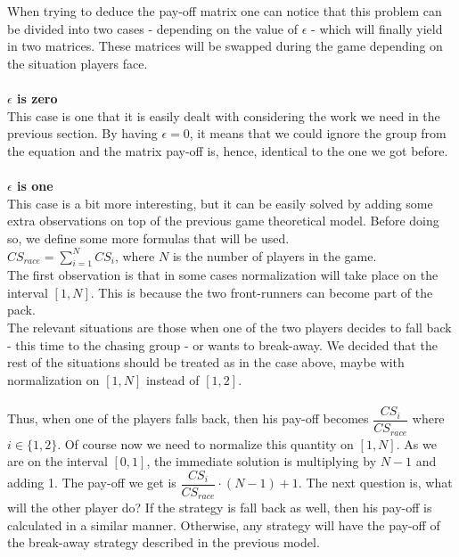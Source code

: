\documentclass[10pt, a4paper]{report}
\begin{document}
\\\\
When trying to deduce the pay-off matrix one can notice that this problem can be divided into two cases - depending on the value of $\epsilon$ - which will finally yield in two matrices. These matrices will be swapped during the game depending on the situation players face.
\\\\
\textbf{$\epsilon$ is zero}
\\
This case is one that it is easily dealt with considering the work we need in the previous section. By having $\epsilon = 0$, it means that we could ignore the group from the equation and the matrix pay-off is, hence, identical to the one we got before.
\\\\
\textbf{$\epsilon$ is one}
\\
This case is a bit more interesting, but it can be easily solved by adding some extra observations on top of the previous game theoretical model. Before doing so, we define some more formulas that will be used.\\
$CS_{race} = \sum\limits_{i=1}^{N} CS_i$, where $N$ is the number of players in the game. \\
The first observation is that in some cases normalization will take place on the interval $[1,N]$. This is because the two front-runners can become part of the pack.\\
The relevant situations are those when one of the two players decides to fall back - this time to the chasing group - or wants to break-away. We decided that the rest of the situations should be treated as in the case above, maybe with normalization on $[1,N]$ instead of $[1,2]$.\\\\
Thus, when one of the players falls back, then his pay-off becomes $\dfrac{CS_i}{CS_{race}}$ where $i\in\{1,2\}$. Of course now we need to normalize this quantity on $[1,N]$. As we are on the interval $[0,1]$, the immediate solution is multiplying by $N-1$ and adding 1. The pay-off we get is $ \dfrac{CS_i}{CS_{race}}\cdot (N-1) + 1$. The next question is, what will the other player do? If the strategy is fall back as well, then his pay-off is calculated in a similar manner. Otherwise, any strategy will have the pay-off of the break-away strategy described in the previous model.
\end{document}
